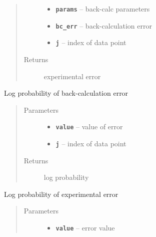 \documentclass[letterpaper,10pt,english]{sphinxmanual}
\begin{document}
\begin{fulllineitems}
\begin{fulllineitems}
\begin{quote}
\begin{description}
\begin{itemize}
\item {} 
\textbf{\texttt{params}} -- back-calc parameters

\item {} 
\textbf{\texttt{bc\_err}} -- back-calculation error

\item {} 
\textbf{\texttt{j}} -- index of data point

\end{itemize}

\item[{Returns}] \leavevmode
experimental error

\end{description}\end{quote}

\end{fulllineitems}


\begin{fulllineitems}
\label{modules:eisd.DataEISD._logp_bc_err}
Log probability of back-calculation error
\begin{quote}\begin{description}
\item[{Parameters}] \leavevmode\begin{itemize}
\item {} 
\textbf{\texttt{value}} -- value of error

\item {} 
\textbf{\texttt{j}} -- index of data point

\end{itemize}

\item[{Returns}] \leavevmode
log probability

\end{description}\end{quote}

\end{fulllineitems}


\begin{fulllineitems}
\label{modules:eisd.DataEISD._logp_exp_err}
Log probability of experimental error
\begin{quote}\begin{description}
\item[{Parameters}] \leavevmode\begin{itemize}
\item {} 
\textbf{\texttt{value}} -- error value


\end{itemize}
\end{description}
\end{quote}
\end{fulllineitems}
\end{fulllineitems}
\end{document}
